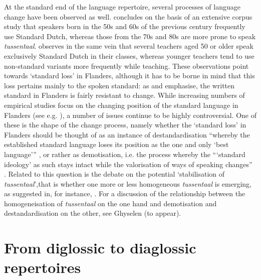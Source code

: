 \documentclass[output=paper]{LSP/langsci}
\begin{document}
At the standard end of the language repertoire, several processes of language change have been observed as well. \citet{plevoets_tussen_2008} concludes on the basis of an extensive corpus study that speakers born in the 50s and 60s of the previous century frequently use Standard Dutch, whereas those from the 70s and 80s are more prone to speak \textit{tussentaal}. \citet{delarue_teachers_2013} observes in the same vein that several teachers aged 50 or older speak exclusively Standard Dutch in their classes, whereas younger teachers tend to use non-standard variants more frequently while teaching. These observations point towards ‘standard loss’ in Flanders, although it has to be borne in mind that this loss pertains mainly to the spoken standard: as \citet[9]{grondelaers_standard_2011b} and \citet{vandekerckhove_belgian_2005} emphasise, the written standard in Flanders is fairly resistant to change. While increasing numbers of empirical studies focus on the changing position of the standard language in Flanders (see e.g. \citealt{plevoets_tussen_2008}), a number of issues continue to be highly controversial. One of these is the shape of the change process, namely whether the ‘standard loss’ in Flanders should be thought of as an instance of destandardisation “whereby the established standard language loses its position as the one and only ‘best language’” \citep[28]{coupland_slice:_2011}, or rather as demotisation, i.e. the process whereby the “‘standard ideology’ as such stays intact while the valorisation of ways of speaking changes” \citep[28]{coupland_slice:_2011}. Related to this question is the debate on the potential ‘stabilisation of \textit{tussentaal}’,that is whether one more or less homogeneous \textit{tussentaal} is emerging, as suggested in, for instance, \citet{willemyns_verkavelingsbrabants._2005}. For a discussion of the relationship between the homogeneisation of \textit{tussentaal} on the one hand and demotisation and destandardisation on the other, see Ghyselen (to appear).

\section{From diglossic to diaglossic repertoires}
\end{document}
